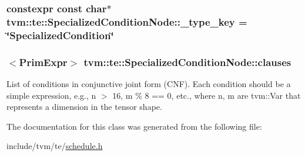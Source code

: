 \subsubsection[{\texorpdfstring{\+\_\+type\+\_\+key}{_type_key}}]{\setlength{\rightskip}{0pt plus 5cm}constexpr const char$\ast$ tvm\+::te\+::\+Specialized\+Condition\+Node\+::\+\_\+type\+\_\+key = \char`\"{}Specialized\+Condition\char`\"{}\hspace{0.3cm}{\ttfamily [static]}}\hypertarget{classtvm_1_1te_1_1SpecializedConditionNode_a1772ec154d41ff8c2f4bfb692eee327d}{}\label{classtvm_1_1te_1_1SpecializedConditionNode_a1772ec154d41ff8c2f4bfb692eee327d}
\subsubsection[{\texorpdfstring{clauses}{clauses}}]{$<${\bf Prim\+Expr}$>$ tvm\+::te\+::\+Specialized\+Condition\+Node\+::clauses}\hypertarget{classtvm_1_1te_1_1SpecializedConditionNode_a8121936069bdc150f53c6c116100b8ad}{}\label{classtvm_1_1te_1_1SpecializedConditionNode_a8121936069bdc150f53c6c116100b8ad}


List of conditions in conjunctive joint form (C\+NF). Each condition should be a simple expression, e.\+g., n $>$ 16, m \% 8 == 0, etc., where n, m are tvm\+::\+Var that represents a dimension in the tensor shape. 



The documentation for this class was generated from the following file\+:\begin{DoxyCompactItemize}
\item 
include/tvm/te/\hyperlink{schedule_8h}{schedule.\+h}\end{DoxyCompactItemize}
